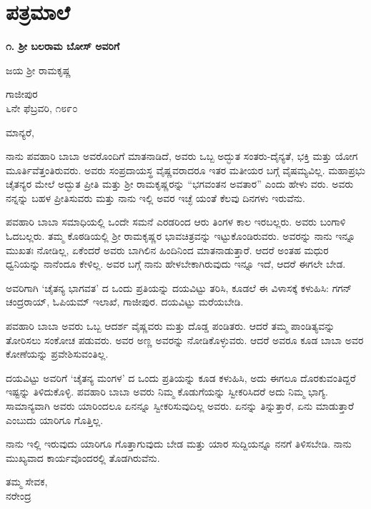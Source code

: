 
\chapter*{ಪತ್ರಮಾಲೆ}

\begin{center}
\textbf{೧. ಶ‍್ರೀ ಬಲರಾಮ ಬೋಸ್ ಅವರಿಗೆ}
\end{center}

\begin{center}
ಜಯ ಶ‍್ರೀ ರಾಮಕೃಷ್ಣ
\end{center}

\begin{flushright}
ಗಾಜೀಪುರ\\೬ನೇ ಫೆಬ್ರವರಿ, ೧೮೯೦
\end{flushright}

ಮಾನ್ಯರೆ,

ನಾನು ಪವಹಾರಿ ಬಾಬಾ ಅವರೊಂದಿಗೆ ಮಾತನಾಡಿದೆ, ಅವರು ಒಬ್ಬ ಅದ್ಭುತ ಸಂತರು-ದೈನ್ಯತೆ, ಭಕ್ತಿ ಮತ್ತು ಯೋಗ ಮೂರ್ತಿವೆತ್ತಂತಿರುವರು. ಅವರು ಸಂಪ್ರದಾಯಸ್ಥ ವೈಷ್ಣವರಾದರೂ ಇತರ ಮತೀಯರ ಬಗ್ಗೆ ವೈಷಮ್ಯವಿಲ್ಲ. ಮಹಾಪ್ರಭು ಚೈತನ್ಯರ ಮೇಲೆ ಅದ್ಭುತ ಪ್ರೀತಿ ಮತ್ತು ಶ‍್ರೀ ರಾಮಕೃಷ್ಣರನ್ನು “ಭಗವಂತನ ಅವತಾರ” ಎಂದು ಹೇಳು ವರು. ಅವರು ನನ್ನನ್ನು ಬಹಳ ಪ್ರೀತಿಸುವರು ಮತ್ತು ನಾನು ಇಲ್ಲಿ ಅವರ ಇಚ್ಛೆ ಯಂತೆ ಕೆಲವು ದಿನಗಳು ಇರುವೆನು.

ಪವಹಾರಿ ಬಾಬಾ ಸಮಾಧಿಯಲ್ಲಿ ಒಂದೇ ಸಮನೆ ಎರಡರಿಂದ ಆರು ತಿಂಗಳ ಕಾಲ ಇರಬಲ್ಲರು. ಅವರು ಬಂಗಾಳಿ ಓದಬಲ್ಲರು. ತಮ್ಮ ಕೊಠಡಿಯಲ್ಲಿ ಶ‍್ರೀ ರಾಮಕೃಷ್ಣರ ಭಾವಚಿತ್ರವನ್ನು ಇಟ್ಟುಕೊಂಡಿರುವರು. ಅವರನ್ನು ನಾನು ಇನ್ನೂ ಮುಖತಃ ನೋಡಿಲ್ಲ, ಏಕೆಂದರೆ ಅವರು ಬಾಗಿಲಿನ ಹಿಂದಿನಿಂದ ಮಾತನಾಡುತ್ತಾರೆ. ಆದರೆ ಅಂತಹ ಮಧುರ ಧ್ವನಿಯನ್ನು ನಾನೆಂದೂ ಕೇಳಿಲ್ಲ. ಅವರ ಬಗ್ಗೆ ನಾನು ಹೇಳಬೇಕಾಗಿರುವುದು ಇನ್ನೂ ಇದೆ, ಆದರೆ ಈಗಲೇ ಬೇಡ.

ಅವರಿಗಾಗಿ ‘ಚೈತನ್ಯ ಭಾಗವತ’ ದ ಒಂದು ಪ್ರತಿಯನ್ನು ದಯವಿಟ್ಟು ತರಿಸಿ, ಕೂಡಲೆ ಈ ವಿಳಾಸಕ್ಕೆ ಕಳುಹಿಸಿ: ಗಗನ್ ಚಂದ್ರರಾಯ್​, ಓಪಿಯಮ್​ ಇಲಾಖೆ, ಗಾಜೀಪುರ. ದಯವಿಟ್ಟು ಮರೆಯಬೇಡಿ.

ಪವಹಾರಿ ಬಾಬಾ ಅವರು ಒಬ್ಬ ಆದರ್ಶ ವೈಷ್ಣವರು ಮತ್ತು ದೊಡ್ಡ ಪಂಡಿತರು. ಆದರೆ ತಮ್ಮ ಪಾಂಡಿತ್ಯವನ್ನು ತೋರಿಸಲು ಸಂಕೋಚ ಪಡುವರು. ಅವರ ಅಣ್ಣ ಅವರನ್ನು ನೋಡಿಕೊಳ್ಳುವರು. ಆದರೆ ಅವರೂ ಕೂಡ ಬಾಬಾ ಅವರ ಕೋಣೆಯನ್ನು ಪ್ರವೇಶಿಸುವಂತಿಲ್ಲ.

ದಯವಿಟ್ಟು ಅವರಿಗೆ ‘ಚೈತನ್ಯ ಮಂಗಳ’ ದ ಒಂದು ಪ್ರತಿಯನ್ನು ಕೂಡ ಕಳುಹಿಸಿ, ಅದು ಈಗಲೂ ದೊರಕುವಂತಿದ್ದರೆ ಇಷ್ಟನ್ನು ತಿಳಿದುಕೊಳ್ಳಿ. ಪವಹಾರಿ ಬಾಬಾ ಅವರು ನಿಮ್ಮ ಕೊಡುಗೆಯನ್ನು ಸ್ವೀಕರಿಸಿದರೆ ಅದು ನಿಮ್ಮ ಭಾಗ್ಯ. ಸಾಮಾನ್ಯವಾಗಿ ಅವರು ಯಾರಿಂದಲೂ ಏನನ್ನೂ ಸ್ವೀಕರಿಸುವುದಿಲ್ಲ ಅವರು. ಏನನ್ನು ತಿನ್ನುತ್ತಾರೆ, ಏನು ಮಾಡುತ್ತಾರೆ ಎಂಬುದು ಯಾರಿಗೂ ಗೊತ್ತಿಲ್ಲ.

ನಾನು ಇಲ್ಲಿ ಇರುವುದು ಯಾರಿಗೂ ಗೊತ್ತಾಗುವುದು ಬೇಡ ಮತ್ತು ಯಾರ ಸುದ್ದಿಯನ್ನೂ ನನಗೆ ತಿಳಿಸಬೇಡಿ. ನಾನು ಮುಖ್ಯವಾದ ಕಾರ್ಯವೊಂದರಲ್ಲಿ ತೊಡಗಿರುವೆನು.

\begin{flushright}
ತಮ್ಮ ಸೇವಕ,\\ನರೇಂದ್ರ
\end{flushright}

